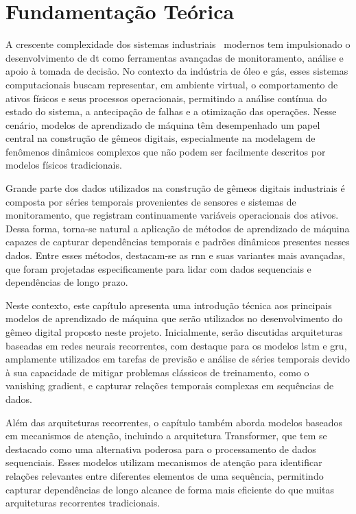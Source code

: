 \chapter{Fundamentação Teórica}
\label{chapter:theorical_found}

A crescente complexidade dos sistemas industriais~\cite{grieves2014digital} modernos tem impulsionado o desenvolvimento de \ac{dt} como ferramentas avançadas de monitoramento, análise e apoio à tomada de decisão. No contexto da indústria de óleo e gás, esses sistemas computacionais buscam representar, em ambiente virtual, o comportamento de ativos físicos e seus processos operacionais, permitindo a análise contínua do estado do sistema, a antecipação de falhas e a otimização das operações. Nesse cenário, modelos de aprendizado de máquina têm desempenhado um papel central na construção de gêmeos digitais, especialmente na modelagem de fenômenos dinâmicos complexos que não podem ser facilmente descritos por modelos físicos tradicionais.

Grande parte dos dados utilizados na construção de gêmeos digitais industriais é composta por séries temporais provenientes de sensores e sistemas de monitoramento, que registram continuamente variáveis operacionais dos ativos. Dessa forma, torna-se natural a aplicação de métodos de aprendizado de máquina capazes de capturar dependências temporais e padrões dinâmicos presentes nesses dados. Entre esses métodos, destacam-se as \ac{rnn} e suas variantes mais avançadas, que foram projetadas especificamente para lidar com dados sequenciais e dependências de longo prazo.

Neste contexto, este capítulo apresenta uma introdução técnica aos principais modelos de aprendizado de máquina que serão utilizados no desenvolvimento do gêmeo digital proposto neste projeto. Inicialmente, serão discutidas arquiteturas baseadas em redes neurais recorrentes, com destaque para os modelos \ac{lstm} e \ac{gru}, amplamente utilizados em tarefas de previsão e análise de séries temporais devido à sua capacidade de mitigar problemas clássicos de treinamento, como o vanishing gradient, e capturar relações temporais complexas em sequências de dados.

Além das arquiteturas recorrentes, o capítulo também aborda modelos baseados em mecanismos de atenção, incluindo a arquitetura Transformer, que tem se destacado como uma alternativa poderosa para o processamento de dados sequenciais. Esses modelos utilizam mecanismos de atenção para identificar relações relevantes entre diferentes elementos de uma sequência, permitindo capturar dependências de longo alcance de forma mais eficiente do que muitas arquiteturas recorrentes tradicionais.

